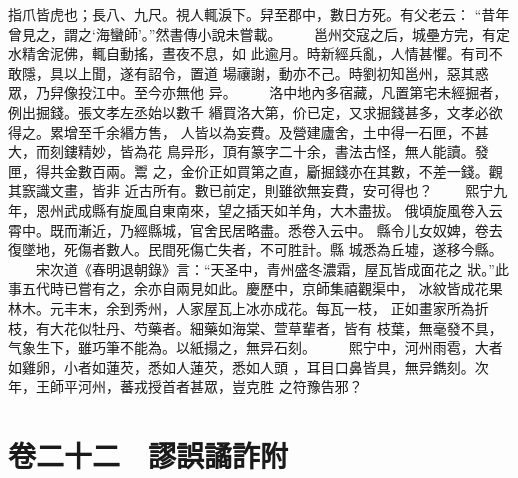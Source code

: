 \documentclass{ctexart}
\begin{document}
指爪皆虎也；長八、九尺。視人輒淚下。舁至郡中，數日方死。有父老云： ``昔年曾見之，謂之`海蠻師'。''然書傳小說未嘗載。 　　邕州交寇之后，城壘方完，有定水精舍泥佛，輒自動搖，晝夜不息，如 此逾月。時新經兵亂，人情甚懼。有司不敢隱，具以上聞，遂有詔令，置道 場禳謝，動亦不己。時劉初知邕州，惡其惑眾，乃舁像投江中。至今亦無他 异。 　　洛中地內多宿藏，凡置第宅未經掘者，例出掘錢。張文孝左丞始以數千 緡買洛大第，价已定，又求掘錢甚多，文孝必欲得之。累增至千余緡方售， 人皆以為妄費。及營建廬舍，土中得一石匣，不甚大，而刻鏤精妙，皆為花 鳥异形，頂有篆字二十余，書法古怪，無人能讀。發匣，得共金數百兩。鬻 之，金价正如買第之直，斸掘錢亦在其數，不差一錢。觀其窾識文畫，皆非 近古所有。數已前定，則雖欲無妄費，安可得也？ 　　熙宁九年，恩州武成縣有旋風自東南來，望之插天如羊角，大木盡拔。 俄頃旋風卷入云霄中。既而漸近，乃經縣城，官舍民居略盡。悉卷入云中。 縣令儿女奴婢，卷去復墜地，死傷者數人。民間死傷亡失者，不可胜計。縣 城悉為丘墟，遂移今縣。 　　宋次道《春明退朝錄》言：``天圣中，青州盛冬濃霜，屋瓦皆成面花之 狀。''此事五代時已嘗有之，余亦自兩見如此。慶歷中，京師集禧觀渠中， 冰紋皆成花果林木。元丰末，余到秀州，人家屋瓦上冰亦成花。每瓦一枝， 正如畫家所為折枝，有大花似牡丹、芍藥者。細藥如海棠、萱草輩者，皆有 枝葉，無毫發不具，气象生下，雖巧筆不能為。以紙搨之，無异石刻。 　　熙宁中，河州雨雹，大者如雞卵，小者如蓮芡，悉如人蓮芡，悉如人頭 ，耳目口鼻皆具，無异鐫刻。次年，王師平河州，蕃戎授首者甚眾，豈克胜 之符豫告邪？
\clearpage
\section{卷二十二　謬誤譎詐附}
\end{document}
